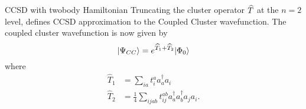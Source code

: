 \begin{frame}{CCSD with twobody Hamiltonian}
    Truncating the cluster operator $\widehat{T}$ at the $n=2$ level, defines CCSD approximation to the Coupled Cluster wavefunction.
    The coupled cluster wavefunction is now given by
        \begin{equation*}
            |\Psi_{CC}\rangle = e^{\widehat{T}_1 + \widehat{T}_2} |\Phi_0\rangle
        \end{equation*}
        where 
        \begin{align*}
            \hat{T}_1 &= 
            \sum_{ia}
                t_{i}^{a} a_{a}^\dagger a_i \\
            \hat{T}_2 &= \frac{1}{4} 
            \sum_{ijab}
                t_{ij}^{ab} a_{a}^\dagger a_{b}^\dagger a_{j} a_{i}.
        \end{align*}
\end{frame}

    
